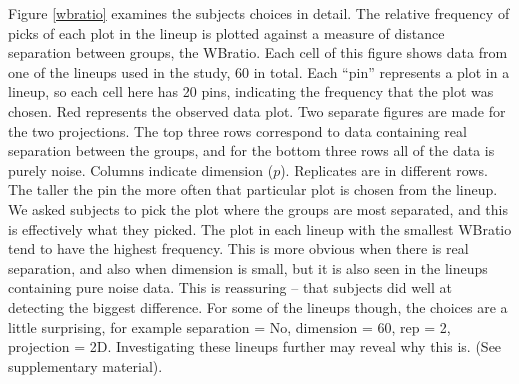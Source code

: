 Figure \ref{wbratio} examines the subjects choices in detail. The relative frequency of picks of each plot in the lineup is plotted against a measure of distance separation between groups, the WBratio. Each cell of this figure shows data from one of the lineups used in the study, 60 in total. Each ``pin'' represents a plot in a lineup, so each cell here has 20 pins, indicating the frequency that the plot was chosen. Red represents the observed data plot. Two separate figures are made for the two projections. The top three rows correspond to data containing real separation between the groups, and for the bottom three rows all of the data is purely noise. Columns indicate dimension ($p$). Replicates are in different rows. The taller the pin the more often that particular plot is chosen from the lineup. We asked subjects to pick the plot where the groups are most separated, and this is effectively what they picked. The plot in each lineup with the smallest WBratio tend to have the highest frequency. This is more obvious when there is real separation, and also when dimension is small, but it is also seen in the lineups containing pure noise data. This is reassuring -- that subjects did well at detecting the biggest difference.  For some of the lineups though, the choices are a little surprising, for example separation = No, dimension = 60, rep = 2, projection = 2D. Investigating these lineups further may reveal why this is. (See supplementary material).

